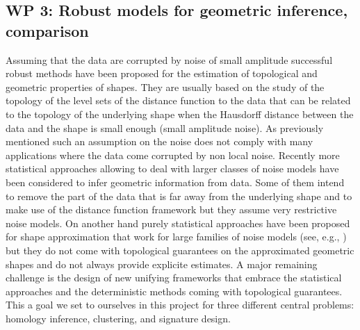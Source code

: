 \subsection*{WP 3:  Robust models for geometric inference, comparison } 


%
%



Assuming that the data are corrupted by noise of small amplitude successful robust methods have been proposed for the estimation of topological and geometric  properties of shapes. They are usually based on the study of the topology of the level sets of the distance function to the data that can be related to the topology of the underlying shape when the Hausdorff distance  between the data and the shape is small enough (small amplitude noise). As previously mentioned such an assumption on the noise does not comply with many applications where the data come corrupted by non local noise. 
Recently more statistical approaches allowing to deal with larger classes of noise models have been considered to infer geometric information from data. Some of them intend to remove the part of the data that is far away from the underlying shape and to make use of  the distance function framework \cite{nsw-tvu-2011} but they assume very restrictive noise models. On another hand purely statistical approaches have been proposed for shape approximation that work for large families of noise models (see, e.g., \cite{gpvw-mme-2011,gpvw-mesd-2011}) but they do not come with topological guarantees on the approximated geometric shapes and do not always provide explicite estimates. A major remaining challenge is the design of new unifying frameworks that embrace the statistical approaches and the deterministic methods coming with topological guarantees.  
This a goal we set to ourselves in this project for three different central problems: homology inference, clustering, and signature design.



